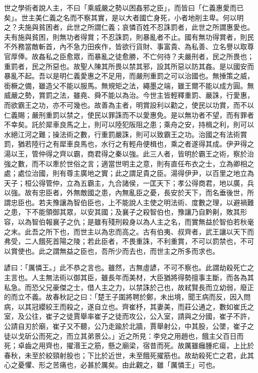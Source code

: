 \begin{pinyinscope}
世之學術者說人主，不曰「乘威嚴之勢以困姦邪之臣」，而皆曰「仁義惠愛而已矣」。世主美仁義之名而不察其實，是以大者國亡身死，小者地削主卑。何以明之？夫施與貧困者，此世之所謂仁義；哀憐百姓不忍誅罰者，此世之所謂惠愛也。夫有施與貧困，則無功者得賞；不忍誅罰，則暴亂者不止。國有無功得賞者，則民不外務當敵斬首，內不急力田疾作，皆欲行貨財、事富貴、為私善、立名譽以取尊官厚俸。故姦私之臣愈眾，而暴亂之徒愈勝，不亡何待？夫嚴刑者，民之所畏也；重罰者，民之所惡也。故聖人陳其所畏以禁其邪，設其所惡以防其姦。是以國安而暴亂不起。吾以是明仁義愛惠之不足用，而嚴刑重罰之可以治國也。無捶策之威，銜橛之備，雖造父不能以服馬。無規矩之法，繩墨之端，雖王爾不能以成方圓。無威嚴之勢，賞罰之法，雖堯、舜不能以為治。今世主皆輕釋重罰、嚴誅，行愛惠，而欲霸王之功，亦不可幾也。故善為主者，明賞設利以勸之，使民以功賞，而不以仁義賜；嚴刑重罰以禁之，使民以罪誅而不以愛惠免。是以無功者不望，而有罪者不幸矣。託於犀車良馬之上，則可以陸犯阪阻之患；乘舟之安，持楫之利，則可以水絕江河之難；操法術之數，行重罰嚴誅，則可以致霸王之功。治國之有法術賞罰，猶若陸行之有犀車良馬也，水行之有輕舟便楫也，乘之者遂得其成。伊尹得之湯以王，管仲得之齊以霸，商君得之秦以強。此三人者，皆明於霸王之術，察於治強之數，而不以牽於世俗之言；適當世明主之意，則有直任布衣之士，立為卿相之處；處位治國，則有尊主廣地之實；此之謂足貴之臣。湯得伊尹，以百里之地立為天子；桓公得管仲，立為五霸主，九合諸侯，一匡天下；孝公得商君，地以廣，兵以強。故有忠臣者，外無敵國之患，內無亂臣之憂，長安於天下，而名垂後世，所謂忠臣也。若夫豫讓為智伯臣也，上不能說人主使之明法術、度數之理，以避禍難之患，下不能領御其眾，以安其國；及襄子之殺智伯也，豫讓乃自黔劓，敗其形容，以為智伯報襄子之仇；是雖有殘刑殺身以為人主之名，而實無益於智伯若秋毫之末。此吾之所下也，而世主以為忠而高之。古有伯夷、叔齊者，武王讓以天下而弗受，二人餓死首陽之陵；若此臣者，不畏重誅，不利重賞，不可以罰禁也，不可以賞使也。此之謂無益之臣也，吾所少而去也，而世主之所多而求也。

諺曰：「厲憐王。」此不恭之言也。雖然，古無虛諺，不可不察也。此謂劫殺死亡之主言也。人主無法術以御其臣，雖長年而美材，大臣猶將得勢擅事主斷，而各為其私急。而恐父兄豪傑之士，借人主之力，以禁誅於己也，故弒賢長而立幼弱，廢正的而立不義。故春秋記之曰：「楚王子圍將聘於鄭，未出境，聞王病而反，因入問病，以其冠纓絞王而殺之，遂自立也。齊崔杼，其妻美，而莊公通之，數如崔氏之室，及公往，崔子之徒賈舉率崔子之徒而攻公，公入室，請與之分國，崔子不許，公請自刃於廟，崔子又不聽，公乃走踰於北牆，賈舉射公，中其股，公墜，崔子之徒以戈斫公而死之，而立其弟景公。」近之所見：李兌之用趙也，餓主父百日而死；卓齒之用齊也，擢湣王之筋，懸之廟梁，宿昔而死。故厲雖癰腫疕瘍，上比於春秋，未至於絞頸射股也；下比於近世，未至餓死擢筋也。故劫殺死亡之君，此其心之憂懼、形之苦痛也，必甚於厲矣。由此觀之，雖「厲憐王」可也。


\end{pinyinscope}